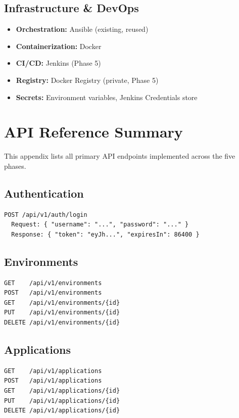 \documentclass[12pt,a4paper]{report}
\begin{document}
\section{Infrastructure \& DevOps}

\begin{itemize}
  \item \textbf{Orchestration:} Ansible (existing, reused)
  \item \textbf{Containerization:} Docker
  \item \textbf{CI/CD:} Jenkins (Phase 5)
  \item \textbf{Registry:} Docker Registry (private, Phase 5)
  \item \textbf{Secrets:} Environment variables, Jenkins Credentials store
\end{itemize}

\chapter{API Reference Summary}

This appendix lists all primary API endpoints implemented across the five phases.

\section{Authentication}

\begin{verbatim}
POST /api/v1/auth/login
  Request: { "username": "...", "password": "..." }
  Response: { "token": "eyJh...", "expiresIn": 86400 }
\end{verbatim}

\section{Environments}

\begin{verbatim}
GET    /api/v1/environments
POST   /api/v1/environments
GET    /api/v1/environments/{id}
PUT    /api/v1/environments/{id}
DELETE /api/v1/environments/{id}
\end{verbatim}

\section{Applications}

\begin{verbatim}
GET    /api/v1/applications
POST   /api/v1/applications
GET    /api/v1/applications/{id}
PUT    /api/v1/applications/{id}
DELETE /api/v1/applications/{id}
\end{verbatim}
\end{document}
